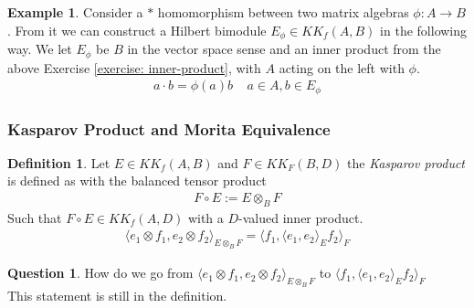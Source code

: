 \documentclass[a4paper]{article}
\newcounter{exercise}
\theoremstyle{definition}
\newtheorem{definition}{Definition}
\theoremstyle{definition}
\newtheorem{question}{Question}
\theoremstyle{definition}
\newtheorem{example}{Example}
\theoremstyle{theorem}
\theoremstyle{theorem}
\begin{document}
\begin{example}
    Consider a $*$ homomorphism between two matrix algebras $\phi:A\rightarrow B$.
    From it we can construct a Hilbert bimodule $E_{\phi} \in KK_f(A, B)$ in the following way.
    We let $E_{\phi}$ be $B$ in the vector space sense and an inner product from the above
    Exercise \ref{exercise: inner-product}, with $A$ acting on the left with $\phi$.
    \begin{align*}
        a\cdot b = \phi(a)b \;\;\;\; a\in A, b\in E_{\phi}
    \end{align*}
\end{example}



\subsubsection{Kasparov Product and Morita Equivalence}
\begin{definition}
    Let $E \in KK_f(A, B)$ and $F \in KK_F(B, D)$ the \textit{Kasparov product} is defined as
    with the balanced tensor product
    \begin{align*}
        F \circ E := E \otimes _B F
    \end{align*}
    Such that $F\circ E \in KK_f(A,D)$ with a $D$-valued inner product.
    \begin{align*}
        \langle e_1 \otimes f_1, e_2 \otimes f_2\rangle _{E\otimes _B F} = \langle f_1,\langle e_1, e_2\rangle _E f_2\rangle _F
    \end{align*}
\end{definition}

\begin{question}
 How do we go from $\langle e_1 \otimes f_1, e_2 \otimes f_2\rangle _{E\otimes _B F}$ to $
    \langle f_1,\langle e_1, e_2\rangle _E f_2\rangle _F$ \label{q: tensorproduct}\\
    This statement is still in the definition.
\end{question}

\end{document}

